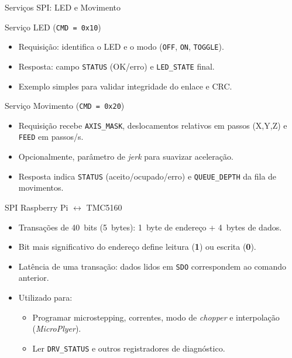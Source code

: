 \documentclass[aspectratio=169]{beamer}
\begin{document}
\begin{frame}{Serviços SPI: LED e Movimento}
  \begin{block}{Serviço LED (\texttt{CMD = 0x10})}
    \begin{itemize}
      \item Requisição: identifica o LED e o modo (\texttt{OFF}, \texttt{ON}, \texttt{TOGGLE}).
      \item Resposta: campo \texttt{STATUS} (OK/erro) e \texttt{LED\_STATE} final.
      \item Exemplo simples para validar integridade do enlace e CRC.
    \end{itemize}
  \end{block}
  \vspace{0.4em}
  \begin{block}{Serviço Movimento (\texttt{CMD = 0x20})}
    \begin{itemize}
      \item Requisição recebe \texttt{AXIS\_MASK}, deslocamentos relativos em passos (X,Y,Z) e \texttt{FEED} em passos/s.
      \item Opcionalmente, parâmetro de \emph{jerk} para suavizar aceleração.
      \item Resposta indica \texttt{STATUS} (aceito/ocupado/erro) e \texttt{QUEUE\_DEPTH} da fila de movimentos.
    \end{itemize}
  \end{block}
\end{frame}

\begin{frame}{SPI Raspberry Pi $\leftrightarrow$ TMC5160}
  \begin{itemize}
    \item Transações de 40~bits (5~bytes): 1~byte de endereço + 4~bytes de dados.
    \item Bit mais significativo do endereço define leitura (\textbf{1}) ou escrita (\textbf{0}).
    \item Latência de uma transação: dados lidos em \texttt{SDO} correspondem ao comando anterior.
    \item Utilizado para:
      \begin{itemize}
        \item Programar microstepping, correntes, modo de \emph{chopper} e interpolação (\emph{MicroPlyer}).
        \item Ler \texttt{DRV\_STATUS} e outros registradores de diagnóstico.
      \end{itemize}
  \end{itemize}
\end{frame}
\end{document}
